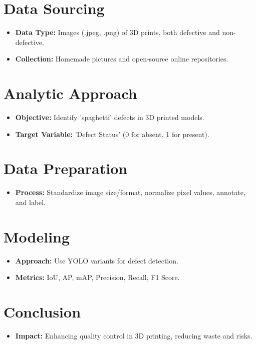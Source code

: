 \documentclass[12pt,a4paper]{article}
\begin{document}
\section{Data Sourcing}
\begin{itemize}
    \item \textbf{Data Type:} Images (.jpeg, .png) of 3D prints, both defective and non-defective.
    \item \textbf{Collection:} Homemade pictures and open-source online repositories.
\end{itemize}

\section{Analytic Approach}
\begin{itemize}
    \item \textbf{Objective:} Identify 'spaghetti' defects in 3D printed models.
    \item \textbf{Target Variable:} 'Defect Status' (0 for absent, 1 for present).
\end{itemize}

\section{Data Preparation}
\begin{itemize}
    \item \textbf{Process:} Standardize image size/format, normalize pixel values, annotate, and label.
\end{itemize}

\section{Modeling}
\begin{itemize}
    \item \textbf{Approach:} Use YOLO variants for defect detection.
    \item \textbf{Metrics:} IoU, AP, mAP, Precision, Recall, F1 Score.
\end{itemize}

\section{Conclusion}
\begin{itemize}
    \item \textbf{Impact:} Enhancing quality control in 3D printing, reducing waste and risks.
\end{itemize}
\end{document}

